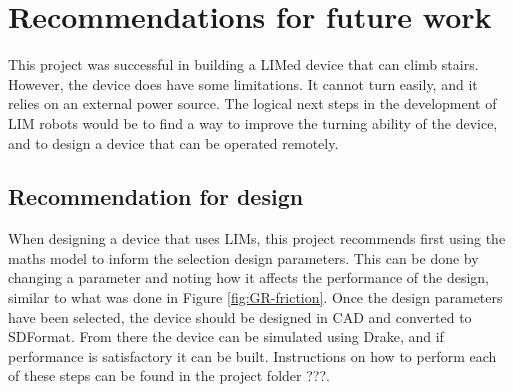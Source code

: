 \chapter{Recommendations for future work}

This project was successful in building a LIMed device that can climb stairs. However, the device does have some limitations. It cannot turn easily, and it relies on an external power source. The logical next steps in the development of LIM robots would be to find a way to improve the turning ability of the device, and to design a device that can be operated remotely. 


\section{Recommendation for design}

When designing a device that uses LIMs, this project recommends first using the maths model to inform the selection design parameters. This can be done by changing a parameter and noting how it affects the performance of the design, similar to what was done in Figure \ref{fig:GR-friction}. Once the design parameters have been selected, the device should be designed in CAD and converted to SDFormat. From there the device can be simulated using Drake, and if performance is satisfactory it can be built. Instructions on how to perform each of these steps can be found in the project folder ???.\\
